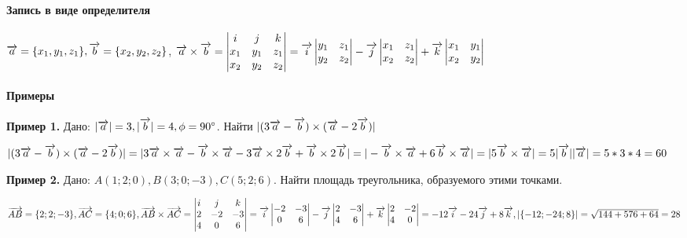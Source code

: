 \documentclass{article}
\def\vec{\ensuremath\overrightarrow}
\begin{document}
\begin{flushleft}
\paragraph{Запись в виде определителя}

\hfill

$\vec{a} = \{ x_1, y_1, z_1 \}, \vec{b} = \{ x_2, y_2, z_2 \}$, $\vec{a} \times \vec{b} = \begin{vmatrix}
    i & j & k \\
    x_1 & y_1 & z_1 \\
    x_2 & y_2 & z_2
\end{vmatrix} = \vec{i} \begin{vmatrix}
    y_1 & z_1 \\
    y_2 & z_2
\end{vmatrix} - \vec{j} \begin{vmatrix}
    x_1 & z_1 \\
    x_2 & z_2
\end{vmatrix} + \vec{k} \begin{vmatrix}
    x_1 & y_1 \\
    x_2 & y_2
\end{vmatrix}$

\paragraph{Примеры}

\hfill

\textbf{Пример 1.} Дано: $|\vec{a}| = 3, |\vec{b}| = 4, \phi = 90^{\circ}$. Найти $|(3\vec{a} - \vec{b}) \times (\vec{a} - 2\vec{b})|$

$|(3\vec{a} - \vec{b}) \times (\vec{a} - 2\vec{b})| = |3\vec{a} \times \vec{a} - \vec{b} \times \vec{a} - 3\vec{a} \times 2 \vec{b} + \vec{b} \times 2 \vec{b}| = |-\vec{b} \times \vec{a} + 6\vec{b} \times \vec{a}| = |5\vec{b} \times \vec{a}| = 5 |\vec{b}| |\vec{a}| = 5 * 3 * 4 = 60$

\hfill

\textbf{Пример 2.} Дано: $A(1; 2; 0), B(3; 0; -3), C(5; 2; 6)$. Найти площадь треугольника, образуемого этими точками.

$\vec{AB} = \{ 2; 2; -3 \}, \vec{AC} = \{4; 0; 6 \}, \vec{AB} \times \vec{AC} = \begin{vmatrix}
    i & j & k \\
    2 & -2 & -3 \\
    4 & 0 & 6
\end{vmatrix} = \vec{i} \begin{vmatrix}
    -2 & -3 \\
    0 & 6
\end{vmatrix} - \vec{j} \begin{vmatrix}
    2 & -3 \\
    4 & 6
\end{vmatrix} + \vec{k} \begin{vmatrix}
    2 & -2 \\
    4 & 0
\end{vmatrix} = -12\vec{i} - 24\vec{j} + 8\vec{k}, |\{ -12; -24; 8 \}| = \sqrt{144 + 576 + 64} = 28$


\end{flushleft}
\end{document}
